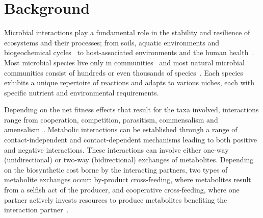 \documentclass[sn-mathphys,Numbered]{sn-jnl}  %
\theoremstyle{thmstyleone}%
\theoremstyle{thmstyletwo}%
\theoremstyle{thmstylethree}%
\begin{document}
\section*{Background}
\label{sec:background}


    Microbial interactions play a fundamental role in the stability and resilience of ecosystems and their processes; from soils, aquatic environments and biogeochemical cycles~\cite{yuan2021climate} to host-associated environments and the human health~\cite{raes2008molecular, faust2012microbialReviewInteractions}.
    Most microbial species live only in communities~\cite{rottjers2018hairballs} and most natural microbial communities consist of hundreds or even thousands of species~\cite{balint2016millions}.
    Each species exhibits a unique repertoire of reactions and adapts to various niches, each with specific nutrient and environmental requirements.
 

    Depending on the net fitness effects that result for the taxa involved, interactions range from cooperation, competition, parasitism, commensalism and amensalism~\cite{faust2012microbialReviewInteractions}.
    Metabolic interactions can be established through a range of contact-independent and contact-dependent mechanisms leading to both positive and negative interactions. 
    These interactions can involve either one-way (unidirectional) or two-way (bidirectional) exchanges of metabolites.
    Depending on the biosynthetic cost borne by the interacting partners, two types of metabolite exchanges occur: by-product cross-feeding, where metabolites result from a selfish act of the producer, and cooperative cross-feeding, where one partner actively invests resources to produce metabolites benefiting the interaction partner~\cite{d2018ecology}.
\end{document}
